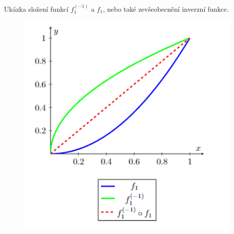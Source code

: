     \begin{graph} Ukázka složení funkcí $f_1^{(-1)} $ a $ f_1$, nebo také zevšeobecnění inverzní funkce.\\

   \begin{figure}[H]
                \hspace{-1cm}
                \includegraphics[scale=0.75]{template-fig/inverz.pdf}
                \centering
            \end{figure}
\end{graph}


